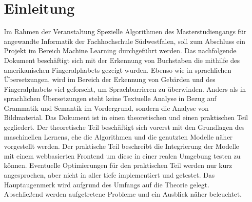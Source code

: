 \documentclass[11pt,bibliography=totocnumbered]{scrartcl}
\begin{document}
\section{Einleitung}
Im Rahmen der Veranstaltung Spezielle Algorithmen des Masterstudiengangs für angewandte Informatik der Fachhochschule Südwestfalen, soll zum Abschluss ein Projekt im Bereich Machine Learning durchgeführt werden. Das nachfolgende Dokument beschäftigt sich mit der Erkennung von Buchstaben die mithilfe des amerikanischen Fingeralphabets gezeigt wurden. Ebenso wie in sprachlichen Übersetzungen, wird im Bereich der Erkennung von Gebärden und des Fingeralphabets viel geforscht, um Sprachbarrieren zu überwinden. Anders als in sprachlichen Übersetzungen steht keine Textuelle Analyse in Bezug auf Grammatik und Semantik im Vordergrund, sondern die Analyse von Bildmaterial.  Das Dokument ist in einen theoretischen und einen praktischen Teil gegliedert. Der theoretische Teil beschäftigt sich vorerst mit den Grundlagen des maschinellen Lernens, ehe die Algorithmen und die genutzten Modelle näher vorgestellt werden. Der praktische Teil beschreibt die Integrierung der Modelle mit einem webbasierten Frontend um diese in einer realen Umgebung testen zu können. Eventuelle Optimierungen für den praktischen Teil werden nur kurz angesprochen, aber nicht in aller tiefe implementiert und getestet. Das Hauptaugenmerk wird aufgrund des Umfangs auf die Theorie gelegt. Abschließend werden aufgetretene Probleme und ein Ausblick näher beleuchtet.
\end{document}
